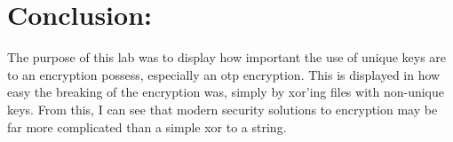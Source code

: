 \documentclass[12pt]{exam}
\begin{document}
    \section*{Conclusion:}

The purpose of this lab was to display how important the use of unique keys are
to an encryption  possess, especially an otp encryption. This is displayed in
how easy the breaking of the encryption was, simply by xor'ing files with
non-unique keys. From this, I can see that modern security solutions to encryption may
be far more complicated than a simple xor to a string.
\end{document}
